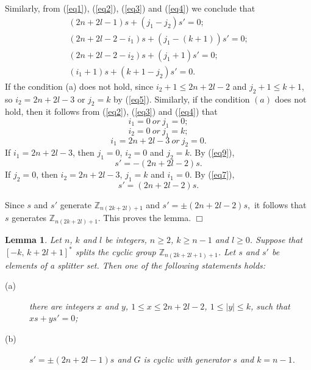 \documentclass[12pt]{article}
\newtheorem{lem}{Lemma}[section]
\newtheorem{open problem}{Open problem}[section]
\newenvironment{proof}{\trivlist
      \item[\hskip\labelsep
      {\itshape Proof.}]\normalfont}
      {\hspace*{\fill}$\Box$\endtrivlist}
\begin{document}
\begin{proof}
Similarly, from (\ref{eq1}), (\ref{eq2}), (\ref{eq3}) and (\ref{eq4}) we conclude that
\begin{gather}
(2n+2l-1)s+(j_1-j_2)s'=0; \label{eq6} \\
(2n+2l-2-i_1)s+(j_1-(k+1))s'=0;   \label{eq7} \\
(2n+2l-2-i_2)s+(j_1+1)s'=0;   \label{eq8} \\
(i_1+1)s+(k+1-j_2)s'=0.    \label{eq9}
\end{gather}
If the condition (a) does not hold, since $i_2+1\le 2n+2l-2$ and $j_2+1\le k+1$, so $i_2=2n+2l-3$ or $j_2=k$ by (\ref{eq5}). Similarly, if the condition
 $(a)$ does not hold, then it follows from (\ref{eq2}), (\ref{eq3}) and (\ref{eq4}) that
$$i_1=0 \ or \ j_1=0;$$
$$i_2=0 \ or \ j_1=k;$$
$$i_1=2n+2l-3 \ or \ j_2=0.$$
If $i_1=2n+2l-3$, then $j_1=0$, $i_2=0$ and $j_2=k$.
By (\ref{eq9}), $$s'=-(2n+2l-2)s.$$
If $j_2=0$, then $i_2=2n+2l-3$, $j_1=k$ and $i_1=0$.
By (\ref{eq7}), $$s'=(2n+2l-2)s.$$

Since $s$ and $s'$ generate $\mathbb{Z}_{n(2k+2l)+1}$ and $s'=\pm(2n+2l-2)s,$ it follows that $s$ generates $\mathbb{Z}_{n(2k+2l)+1}$. This proves the lemma.
\end{proof}

\begin{lem} \label{Olemmid}
Let $n$, $k$ and $l$ be integers, $n\geq 2$, $k\geq n-1$ and $l\geq 0$.
Suppose that $[-k, \,k+2l+1]^*$ splits the cyclic group $\mathbb{Z}_{n(2k+2l+1)+1}$.
Let $s$ and $s'$ be elements of a splitter set.
Then one of the following statements holds:
\begin{description}
  \item[(a)] there are integers $x$ and $y$, $1\leq x\leq 2n+2l-2$, $1\leq |y|\leq k$, such that $xs+ys'=0$;
  \item[(b)] $s'=\pm(2n+2l-1)s$ and $G$ is cyclic with generator $s$ and $k=n-1$.
\end{description}
\end{lem}
\end{document}
